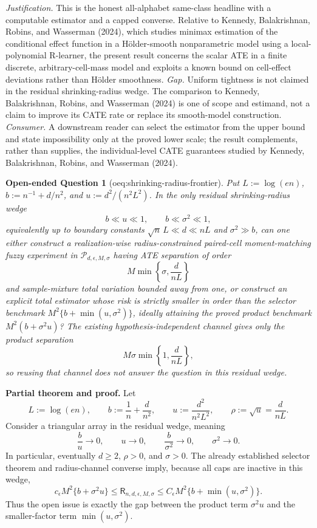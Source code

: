 \documentclass{article}
\newtheorem{openendedquestion}{Open-ended Question}
\begin{document}
\par\smallskip\noindent \textit{Justification.} This is the honest all-alphabet same-class headline with a computable estimator and a capped converse.  Relative to Kennedy, Balakrishnan, Robins, and Wasserman (2024), which studies minimax estimation of the conditional effect function in a Hölder-smooth nonparametric model using a local-polynomial R-learner, the present result concerns the scalar ATE in a finite discrete, arbitrary-cell-mass model and exploits a known bound on cell-effect deviations rather than Hölder smoothness. \textit{Gap.} Uniform tightness is not claimed in the residual shrinking-radius wedge.  The comparison to Kennedy, Balakrishnan, Robins, and Wasserman (2024) is one of scope and estimand, not a claim to improve its CATE rate or replace its smooth-model construction. \textit{Consumer.} A downstream reader can select the estimator from the upper bound and state impossibility only at the proved lower scale; the result complements, rather than supplies, the individual-level CATE guarantees studied by Kennedy, Balakrishnan, Robins, and Wasserman (2024).

\begin{openendedquestion}[oeq:shrinking-radius-frontier]\label{oeq:shrinking-radius-frontier}
Put \(L:=\log(en)\), \(b:=n^{-1}+d/n^2\), and \(u:=d^2/(n^2L^2)\).  In the only residual shrinking-radius wedge
\[
 b\ll u\ll1,
 \qquad
 b\ll\sigma^2\ll1,
\]
equivalently up to boundary constants \(\sqrt n\,L\ll d\ll nL\) and \(\sigma^2\gg b\), can one either construct a realization-wise radius-constrained paired-cell moment-matching fuzzy experiment in \(\mathcal P_{d,\epsilon,M,\sigma}\) having ATE separation of order
\[
 M\min\left\{\sigma,\frac{d}{nL}\right\}
\]
and sample-mixture total variation bounded away from one, or construct an explicit total estimator whose risk is strictly smaller in order than the selector benchmark \(M^2\{b+\min(u,\sigma^2)\}\), ideally attaining the proved product benchmark \(M^2(b+\sigma^2u)\)?  The existing hypothesis-independent channel gives only the product separation
\[
 M\sigma\min\left\{1,\frac{d}{nL}\right\},
\]
so reusing that channel does not answer the question in this residual wedge.
\end{openendedquestion}
\textbf{Partial theorem and proof.}
Let
\[
 L:=\log(en),\qquad
 b:=\frac1n+\frac d{n^2},\qquad
 u:=\frac{d^2}{n^2L^2},\qquad
 \rho:=\sqrt u=\frac d{nL}.
\]
Consider a triangular array in the residual wedge, meaning
\[
 \frac b u\longrightarrow0,\qquad u\longrightarrow0,
 \qquad \frac b{\sigma^2}\longrightarrow0,
 \qquad \sigma^2\longrightarrow0.
\]
In particular, eventually \(d\ge2\), \(\rho>0\), and \(\sigma>0\).
The already established selector theorem and radius-channel converse imply, because all caps are inactive in this wedge,
\[
 c_{\epsilon}M^2\{b+\sigma^2u\}
 \le \mathsf R_{n,d,\epsilon,M,\sigma}
 \le C_{\epsilon}M^2\{b+\min(u,\sigma^2)\}.
\tag{1}
\]
Thus the open issue is exactly the gap between the product term \(\sigma^2u\) and the smaller-factor term \(\min(u,\sigma^2)\).
\end{document}
